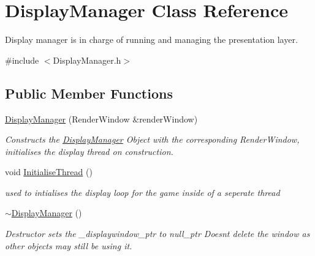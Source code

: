\hypertarget{class_display_manager}{}\section{Display\+Manager Class Reference}
\label{class_display_manager}


Display manager is in charge of running and managing the presentation layer.  




{\ttfamily \#include $<$Display\+Manager.\+h$>$}

\subsection*{Public Member Functions}
\begin{DoxyCompactItemize}
\item 
\hyperlink{class_display_manager_a5cae0a0f81cbd2457eca8d35733a0516}{Display\+Manager} (Render\+Window \&render\+Window)
\begin{DoxyCompactList}\small\item\em Constructs the \hyperlink{class_display_manager}{Display\+Manager} Object with the corresponding Render\+Window, initialises the display thread on construction. \end{DoxyCompactList}\item 
\mbox{\label{class_display_manager_ab1c3eaf2694410423b6b1eca6a58436f}} 
void \hyperlink{class_display_manager_ab1c3eaf2694410423b6b1eca6a58436f}{Initialise\+Thread} ()
\begin{DoxyCompactList}\small\item\em used to intialises the display loop for the game inside of a seperate thread \end{DoxyCompactList}\item 
\mbox{\label{class_display_manager_ae4c9d79e08490e64602cf562a16d8834}} 
\hyperlink{class_display_manager_ae4c9d79e08490e64602cf562a16d8834}{$\sim$\+Display\+Manager} ()
\begin{DoxyCompactList}\small\item\em Destructor sets the \+\_\+displaywindow\+\_\+ptr to null\+\_\+ptr Doesnt delete the window as other objects may still be using it. \end{DoxyCompactList}\end{DoxyCompactItemize}
